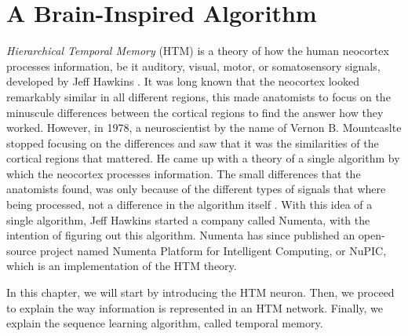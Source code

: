 \chapter{A Brain-Inspired Algorithm}
\label{chp_htm}
\textit{Hierarchical Temporal Memory} (HTM) is a theory of how the human neocortex processes information, be it auditory, visual, motor, or somatosensory signals, developed by Jeff Hawkins \cite{Hawkins:2004:INT:993636}. It was long known that the neocortex looked remarkably similar in all different regions, this made anatomists to focus on the minuscule differences between the cortical regions to find the answer how they worked. However, in 1978, a neuroscientist by the name of Vernon B. Mountcaslte stopped focusing on the differences and saw that it was the similarities of the cortical regions that mattered. He came up with a theory of a single algorithm by which the neocortex processes information. The small differences that the anatomists found, was only because of the different types of signals that where being processed, not a difference in the algorithm itself \cite{Hawkins:2004:INT:993636}. With this idea of a single algorithm, Jeff Hawkins started a company called Numenta, with the intention of figuring out this algorithm. Numenta has since published an open-source project named Numenta Platform for Intelligent Computing, or NuPIC, which is an implementation of the HTM theory. 

In this chapter, we will start by introducing the HTM neuron. Then, we proceed to explain the way information is represented in an HTM network. Finally, we explain the sequence learning algorithm, called temporal memory.








